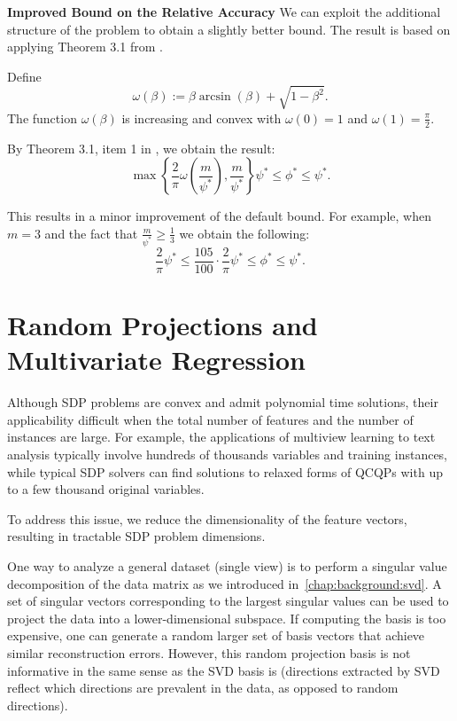 \noindent\textbf{Improved Bound on the Relative Accuracy}
We can exploit the additional structure of the problem to obtain a slightly better bound. 
The result is based on applying Theorem 3.1 from \cite{Nesterov98globalquadratic}.

Define
$$\omega\left(\beta\right) := \beta \arcsin\left(\beta\right) + \sqrt{1 - \beta^2}.$$
The function $\omega\left(\beta\right)$ is increasing and convex with 
$\omega\left(0\right) = 1$ and $\omega\left(1\right) = \frac{\pi}{2}$.

By Theorem 3.1, item 1 in \cite{Nesterov98globalquadratic}, we obtain the result:
$$ \max\left\{\frac{2}{\pi}\omega\left(\frac{m}{\psi^*}\right), \frac{m}{\psi^*} \right\}   \psi^* \leq \phi^* \leq \psi^*.$$

This results in a minor improvement of the default bound. For example, when $m = 3$ and 
the fact that $\frac{m}{\psi^*} \geq \frac{1}{3}$ we obtain the following:
$$ \frac{2}{\pi} \psi^* \leq \frac{105}{100}  \cdot \frac{2}{\pi} \psi^* \leq \phi^* \leq \psi^*.$$


\section{Random Projections and Multivariate Regression}\label{chap:relaxations:practical}

Although SDP problems are convex and admit polynomial time solutions, their
applicability difficult when the total number of features and the number of
instances are large. For example, the applications of multiview
learning to text analysis typically involve hundreds of thousands variables
and training instances, while typical SDP solvers can find solutions to relaxed forms of
QCQPs with up to a few thousand original variables.

To address this issue, we reduce the dimensionality of the feature vectors, resulting in
tractable SDP problem dimensions.

One way to analyze a general dataset (single view) is to
perform a singular value decomposition of the data matrix as 
we introduced in~\ref{chap:background:svd}. 
A set of singular vectors corresponding to the largest singular
values can be used to project the data into a lower-dimensional
subspace. If computing the basis is too expensive, one can generate a random
larger set of basis vectors that achieve similar reconstruction
errors. However, this random projection basis is not
informative in the same sense as the SVD basis is 
(directions extracted by SVD reflect which directions are
prevalent in the data, as opposed to random directions).

